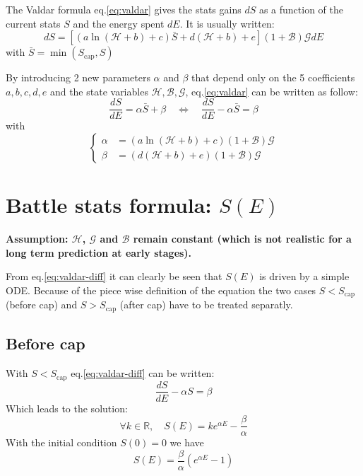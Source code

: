 \documentclass[12pt]{article}
\def\happy{\mathcal{H}}
\def\gym{\mathcal{G}}
\def\bonus{\mathcal{B}}
\def\Sc{S_\text{cap}}
\begin{document}
The Valdar formula eq.\eqref{eq:valdar} gives the stats gains $dS$ as a function of the current stats $S$ and the energy spent $dE$. It is usually written:
\begin{equation}
    dS = \left[ (a\ln(\happy+b)+c) \bar{S} + d(\happy+b) + e \right](1+\bonus)\gym dE
    \label{eq:valdar}
\end{equation}
with $\bar{S} = \min(\Sc, S)$

\par By introducing 2 new parameters $\alpha$ and $\beta$ that depend only on the 5 coefficients $a, b, c, d, e$ and the state variables $\happy, \bonus, \gym$, eq.\eqref{eq:valdar} can be written as follow:
\begin{equation}
    \frac{dS}{dE} = \alpha \bar{S} + \beta \quad \Leftrightarrow \quad \frac{dS}{dE} - \alpha \bar{S} = \beta
    \label{eq:valdar-diff}
\end{equation}
with
\begin{equation}
    \left\{\begin{aligned}
        \alpha &= (a\ln(\happy+b)+c)(1+\bonus)\gym\\
        \beta &= (d(\happy+b) +e)(1+\bonus)\gym
    \end{aligned}\right.
\end{equation}

\section{Battle stats formula: $S(E)$}
\par {\color{myred}\bf Assumption: $\happy$, $\gym$ and $\bonus$ remain constant (which is not realistic for a long term prediction at early stages).}

\par From eq.\eqref{eq:valdar-diff} it can clearly be seen that $S(E)$ is driven by a simple ODE. Because of the piece wise definition of the equation the two cases $S<\Sc$ (before cap) and $S>\Sc$ (after cap) have to be treated separatly.

\subsection{Before cap}
With $S<\Sc$ eq.\eqref{eq:valdar-diff} can be written:
\begin{equation}
    \frac{dS}{dE} -\alpha S = \beta
\end{equation}
Which leads to the solution:
\begin{equation}
    \forall k \in \mathbb{R},\quad S(E) = ke^{\alpha E} - \frac{\beta}{\alpha}
    \label{eq:bs-bc-diff-k}
\end{equation}
With the initial condition $S(0)=0$ we have
\begin{equation}
    S(E) = \frac{\beta}{\alpha}\left(e^{\alpha E} - 1\right)
    \label{eq:bs-bc-diff}
\end{equation}
\end{document}
